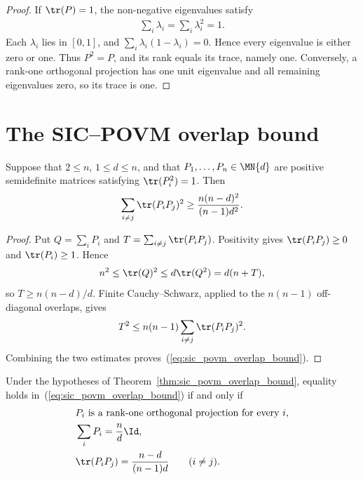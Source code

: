 \begin{proof}\leanok
    If $\tr(P)=1$, the non-negative eigenvalues satisfy
    \begin{align}
        \sum_i\lambda_i=\sum_i\lambda_i^2=1.
    \end{align}
    Each $\lambda_i$ lies in $[0,1]$, and
    $\sum_i\lambda_i(1-\lambda_i)=0$. Hence every eigenvalue is either zero
    or one. Thus $P^2=P$, and its rank equals its trace, namely one. Conversely,
    a rank-one orthogonal projection has one unit eigenvalue and all remaining
    eigenvalues zero, so its trace is one.
\end{proof}

\section{The SIC--POVM overlap bound}

\begin{theorem}
    \label{thm:sic_povm_overlap_bound}
    \leanok
    Suppose that $2\le n$, $1\le d\le n$, and that
    $P_1,\ldots,P_n\in\MN{d}$ are positive semidefinite matrices satisfying
    $\tr(P_i^2)=1$. Then
    \begin{align}
        \sum_{i\ne j}\tr(P_iP_j)^2
        \ge \frac{n(n-d)^2}{(n-1)d^2}.
        \label{eq:sic_povm_overlap_bound}
    \end{align}
\end{theorem}

\begin{proof}\leanok
    Put $Q=\sum_iP_i$ and
    $T=\sum_{i\ne j}\tr(P_iP_j)$. Positivity gives
    $\tr(P_iP_j)\ge0$ and $\tr(P_i)\ge1$. Hence
    \begin{align}
        n^2
        \le \tr(Q)^2
        \le d\tr(Q^2)
        =d(n+T),
    \end{align}
    so $T\ge n(n-d)/d$. Finite Cauchy--Schwarz, applied to the
    $n(n-1)$ off-diagonal overlaps, gives
    \begin{align}
        T^2\le n(n-1)\sum_{i\ne j}\tr(P_iP_j)^2.
    \end{align}
    Combining the two estimates proves~(\ref{eq:sic_povm_overlap_bound}).
\end{proof}

\begin{theorem}
    \label{thm:sic_povm_overlap_bound_equality}
    \leanok
    Under the hypotheses of Theorem~\ref{thm:sic_povm_overlap_bound}, equality
    holds in~(\ref{eq:sic_povm_overlap_bound}) if and only if
    \begin{align}
         & P_i\text{ is a rank-one orthogonal projection for every }i, \\
         & \sum_iP_i=\frac nd\Id,                                      \\
         & \tr(P_iP_j)=\frac{n-d}{(n-1)d}\qquad(i\ne j).
    \end{align}
\end{theorem}

